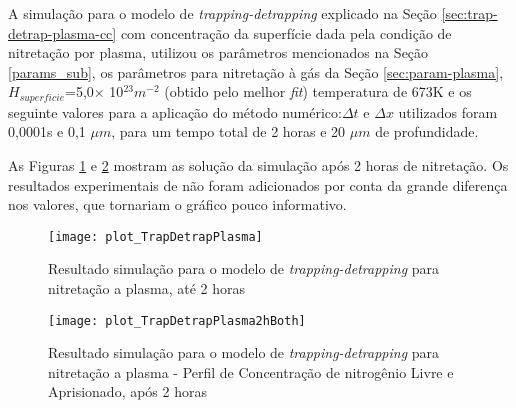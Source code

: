 A simulação para o modelo de \textit{trapping-detrapping} explicado na Seção \ref{sec:trap-detrap-plasma-cc} com concentração da superfície dada pela condição de nitretação por plasma, utilizou os parâmetros mencionados na Seção \ref{params_sub}, os parâmetros para nitretação à gás da Seção \ref{sec:param-plasma}, $H_{superficie}$=5,0$\times$ 10$^{23} m^{-2}$ (obtido pelo melhor \textit{fit}) temperatura de 673K e os seguinte valores para a aplicação do método numérico:$\Delta t$ e $\Delta x$ utilizados foram 0,0001s e 0,1 $\mu m$, para um tempo total de 2 horas e 20 $\mu m$ de profundidade.

As Figuras \ref{fig:td-csvar-plasma} e \ref{fig:td-csvar-plasma-both} mostram as solução da simulação após 2 horas de nitretação. Os resultados experimentais de \cite{moskalioviene2011modeling} não foram adicionados por conta da grande diferença nos valores, que tornariam o gráfico pouco informativo.

\begin{figure}[ht]
\centering
	\caption{Resultado simulação para o modelo de \textit{trapping-detrapping} para nitretação a plasma, até 2 horas}
\texttt{[image: plot\_TrapDetrapPlasma]}
	\label{fig:td-csvar-plasma}
	\centering
\end{figure}

\begin{figure}[ht]
\centering
	\caption{Resultado simulação para o modelo de \textit{trapping-detrapping} para nitretação a plasma - Perfil de Concentração de nitrogênio Livre e Aprisionado, após 2 horas}
\texttt{[image: plot\_TrapDetrapPlasma2hBoth]}
	\label{fig:td-csvar-plasma-both}
	\centering
\end{figure}